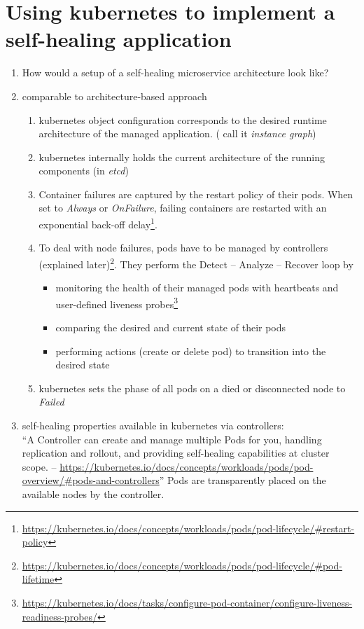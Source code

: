 \section{Using \gls{kubernetes} to implement a self-healing application}
  \begin{enumerate}
    \item How would a setup of a self-healing microservice architecture look like?
    \item comparable to architecture-based approach
      \begin{enumerate}
        \item \gls{kubernetes} object configuration corresponds to the desired runtime architecture of the managed application. (\cite{ToffettiMicroservices} call it \textit{instance graph})
        \item \gls{kubernetes} internally holds the current architecture of the running components (in \textit{etcd})
        \item Container failures are captured by the restart policy of their pods. When set to \textit{Always} or \textit{OnFailure}, failing containers are restarted with an exponential back-off delay\footnote{\url{https://kubernetes.io/docs/concepts/workloads/pods/pod-lifecycle/\#restart-policy}}.
        \item To deal with node failures, pods have to be managed by controllers (explained later)\footnote{\url{https://kubernetes.io/docs/concepts/workloads/pods/pod-lifecycle/\#pod-lifetime}}. They perform the Detect -- Analyze -- Recover loop by
          \begin{itemize}
            \item monitoring the health of their managed pods with heartbeats and user-defined liveness probes\footnote{\url{https://kubernetes.io/docs/tasks/configure-pod-container/configure-liveness-readiness-probes/}}
            \item comparing the desired and current state of their pods
            \item performing actions (create or delete pod) to transition into the desired state
          \end{itemize}
        \item \gls{kubernetes} sets the phase of all pods on a died or disconnected node to \textit{Failed}
      \end{enumerate}
    \item self-healing properties available in \gls{kubernetes} via controllers:\hfill\\
          \enquote{A Controller can create and manage multiple Pods for you, handling replication and rollout, and providing self-healing capabilities at cluster scope. -- \url{https://kubernetes.io/docs/concepts/workloads/pods/pod-overview/\#pods-and-controllers}}
          Pods are transparently placed on the available nodes by the controller.


\end{enumerate}

